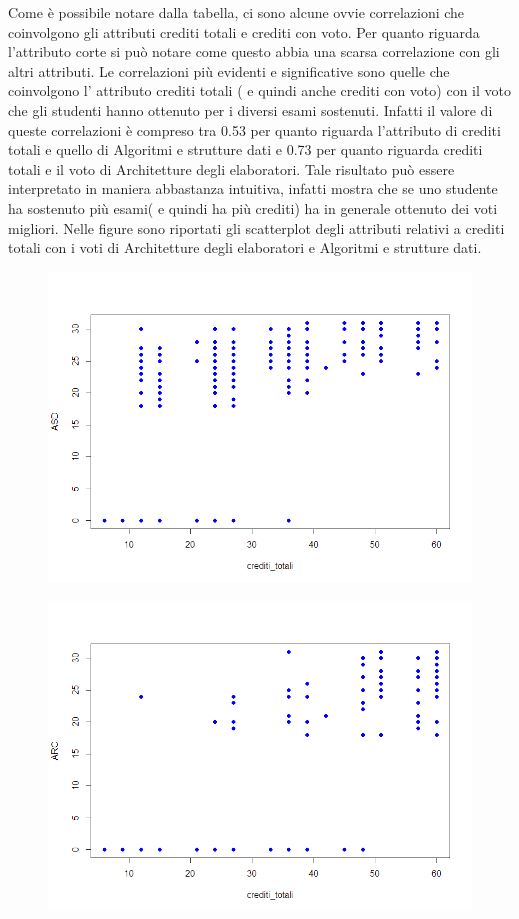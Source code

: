 \documentclass[12pt]{article}
\begin{document}
Come è possibile notare dalla tabella, ci sono alcune ovvie correlazioni che coinvolgono gli attributi crediti totali e crediti con voto.
Per quanto riguarda l'attributo corte si può notare come questo abbia una scarsa correlazione con gli altri attributi.
Le correlazioni più evidenti e significative sono quelle che coinvolgono l' attributo crediti totali ( e quindi anche crediti con voto) con il voto che gli studenti hanno ottenuto per i diversi esami sostenuti.
Infatti il valore di queste correlazioni è compreso tra 0.53 per quanto riguarda l'attributo di crediti totali e quello di Algoritmi e strutture dati e 0.73 per quanto riguarda crediti totali e il voto di Architetture degli elaboratori.
Tale risultato può essere interpretato in maniera abbastanza intuitiva, infatti mostra che se uno studente ha sostenuto più esami( e quindi ha più crediti) ha in generale ottenuto dei voti migliori.
Nelle figure sono riportati gli scatterplot degli attributi relativi a crediti totali con i voti di Architetture degli elaboratori e Algoritmi e strutture dati.
\begin{figure}[H]
	\includegraphics[width=\textwidth]{img/creditiAsd.png}
\end{figure}

\begin{figure}[H]
	\includegraphics[width=\textwidth]{img/creditiArc.png}
\end{figure}
\end{document}
